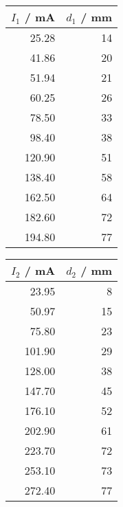 \begin{tabular}{r|r}
$I_1$ / mA & $d_1$ / mm \\
\hline
25.28 & 14\\
41.86 & 20\\
51.94 & 21\\
60.25 & 26\\
78.50 & 33\\
98.40 & 38\\
120.90 & 51\\
138.40 & 58\\
162.50 & 64\\
182.60 & 72\\
194.80 & 77\\
\end{tabular}\quad\quad\quad\begin{tabular}{r|r}
$I_2$ / mA & $d_2$ / mm \\
\hline
23.95 & 8\\
50.97 & 15\\
75.80 & 23\\
101.90 & 29\\
128.00 & 38\\
147.70 & 45\\
176.10 & 52\\
202.90 & 61\\
223.70 & 72\\
253.10 & 73\\
272.40 & 77\\
\end{tabular}
